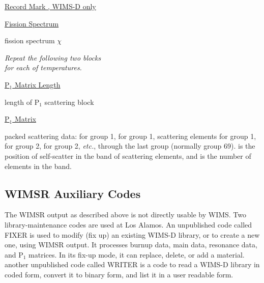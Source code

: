 \noindent
\underline{Record Mark , WIMS-D only}
\vspace{12pt}


\noindent
\underline{Fission Spectrum}
\begin{list}{}{\setlength{\leftmargin}{2in}\setlength{\labelwidth}{1.7in}}
\item[\cword{(FSPECT(I),I=1,NGND)}\hfill] fission spectrum $\chi$
\end{list}


\begin{center}
     \it
     Repeat the following two blocks\\
     for each of  temperatures.
\end{center}

\noindent
\underline{P$_1$ Matrix Length }

\begin{list}{}{\setlength{\leftmargin}{2in}\setlength{\labelwidth}{1.7in}}
\item[\cword{NDAT}\hfill] length of P$_1$ scattering block
\end{list}

\newpage
\noindent
\underline{P$_1$ Matrix }

\begin{list}{}{\setlength{\leftmargin}{2in}\setlength{\labelwidth}{1.7in}}
\item[\cword{XS(I),I=1,NDAT)}\hfill] packed scattering data:  for
     group 1,  for group 1,  scattering elements
     for group 1,  for group 2,  for group 2, {\it etc.},
     through the last group (normally group 69).   is the
     position of self-scatter in the band of scattering elements, and
      is the number of elements in the band.
\end{list}

\subsection{WIMSR Auxiliary Codes}
\label{ssWIMSR_aux}

The WIMSR output as described above is not directly usable by
WIMS.  Two library-maintenance codes are used at Los Alamos.
An unpublished code called FIXER is used to modify (fix up) an
existing WIMS-D library, or to create a new one, using WIMSR
output.  It processes burnup data, main data, resonance data,
and P$_1$ matrices.  In its fix-up mode, it can replace,
delete, or add a material.  another unpublished code called
WRITER is a code to read a WIMS-D library in coded form, convert
it to binary form, and list it in a user readable form.

